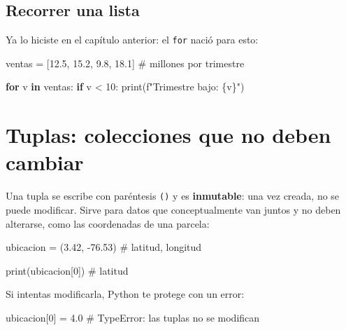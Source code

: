 \documentclass[
  spanish,
  letterpaper,
  DIV=11,
  numbers=noendperiod]{scrreprt}
\newenvironment{Shaded}{\begin{snugshade}}{\end{snugshade}}
\newcommand{\BuiltInTok}[1]{\textcolor[rgb]{0.00,0.23,0.31}{#1}}
\newcommand{\CommentTok}[1]{\textcolor[rgb]{0.37,0.37,0.37}{#1}}
\newcommand{\ControlFlowTok}[1]{\textcolor[rgb]{0.00,0.23,0.31}{\textbf{#1}}}
\newcommand{\DecValTok}[1]{\textcolor[rgb]{0.68,0.00,0.00}{#1}}
\newcommand{\FloatTok}[1]{\textcolor[rgb]{0.68,0.00,0.00}{#1}}
\newcommand{\KeywordTok}[1]{\textcolor[rgb]{0.00,0.23,0.31}{\textbf{#1}}}
\newcommand{\NormalTok}[1]{\textcolor[rgb]{0.00,0.23,0.31}{#1}}
\newcommand{\OperatorTok}[1]{\textcolor[rgb]{0.37,0.37,0.37}{#1}}
\newcommand{\SpecialCharTok}[1]{\textcolor[rgb]{0.37,0.37,0.37}{#1}}
\newcommand{\SpecialStringTok}[1]{\textcolor[rgb]{0.13,0.47,0.30}{#1}}
\begin{document}
\subsection{Recorrer una lista}\label{recorrer-una-lista}

Ya lo hiciste en el capítulo anterior: el \texttt{for} nació para esto:

\begin{Shaded}
\begin{Highlighting}[]
\NormalTok{ventas }\OperatorTok{=}\NormalTok{ [}\FloatTok{12.5}\NormalTok{, }\FloatTok{15.2}\NormalTok{, }\FloatTok{9.8}\NormalTok{, }\FloatTok{18.1}\NormalTok{]  }\CommentTok{\# millones por trimestre}

\ControlFlowTok{for}\NormalTok{ v }\KeywordTok{in}\NormalTok{ ventas:}
    \ControlFlowTok{if}\NormalTok{ v }\OperatorTok{\textless{}} \DecValTok{10}\NormalTok{:}
        \BuiltInTok{print}\NormalTok{(}\SpecialStringTok{f"Trimestre bajo: }\SpecialCharTok{\{}\NormalTok{v}\SpecialCharTok{\}}\SpecialStringTok{"}\NormalTok{)}
\end{Highlighting}
\end{Shaded}

\section{Tuplas: colecciones que no deben
cambiar}\label{tuplas-colecciones-que-no-deben-cambiar}

Una tupla se escribe con paréntesis \texttt{()} y es \textbf{inmutable}:
una vez creada, no se puede modificar. Sirve para datos que
conceptualmente van juntos y no deben alterarse, como las coordenadas de
una parcela:

\begin{Shaded}
\begin{Highlighting}[]
\NormalTok{ubicacion }\OperatorTok{=}\NormalTok{ (}\FloatTok{3.42}\NormalTok{, }\OperatorTok{{-}}\FloatTok{76.53}\NormalTok{)  }\CommentTok{\# latitud, longitud}

\BuiltInTok{print}\NormalTok{(ubicacion[}\DecValTok{0}\NormalTok{])  }\CommentTok{\# latitud}
\end{Highlighting}
\end{Shaded}

Si intentas modificarla, Python te protege con un error:

\begin{Shaded}
\begin{Highlighting}[]
\NormalTok{ubicacion[}\DecValTok{0}\NormalTok{] }\OperatorTok{=} \FloatTok{4.0}   \CommentTok{\# TypeError: las tuplas no se modifican}
\end{Highlighting}
\end{Shaded}
\end{document}
